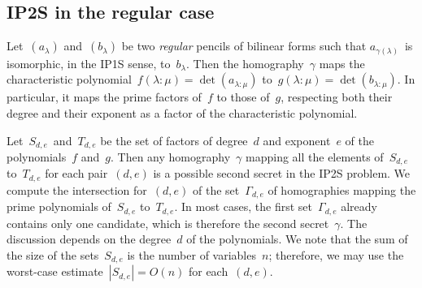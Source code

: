 \documentclass{article}%
\def\abs#1{\left|#1\right|}
\def\mat#1{\begin{pmatrix}#1\end{pmatrix}}
\def\smat{\def\arraystretch{.66}\mat}
\def\card#1{\abs{#1}}
\DeclareMathOperator\GL{GL}
\begin{document}
% 
% 


\subsection{IP2S in the regular case}

Let~$(a_{λ})$ and~$(b_{λ})$ be two \emph{regular} pencils of bilinear
forms such that $a_{γ(λ)}$~is isomorphic, in the IP1S sense, to~$b_{λ}$.
Then the homography~$γ$ maps the characteristic polynomial~$f(λ:μ)
= \det (a_{λ:μ})$ to~$g(λ:μ) = \det (b_{λ:μ})$. In particular, it maps the
prime factors of~$f$ to those of~$g$, respecting both their degree and
their exponent as a factor of the characteristic polynomial.

Let~$S_{d,e}$~and~$T_{d,e}$ be the set of factors of degree~$d$ and
exponent~$e$ of the polynomials~$f$ and~$g$. Then any homography~$γ$
mapping all the elements of~$S_{d,e}$ to~$T_{d,e}$ for each pair~$(d,e)$
is a possible second secret in the IP2S problem. We compute the
intersection for~$(d,e)$ of the set~$Γ_{d,e}$ of homographies mapping the
prime polynomials of~$S_{d,e}$ to~$T_{d,e}$. In most cases, the first
set~$Γ_{d,e}$ already contains only one candidate, which is therefore the
second secret~$γ$. The discussion depends on the degree~$d$ of the
polynomials. We note that the sum of the size of the sets~$S_{d,e}$ is
the number of variables~$n$; therefore, we may use the worst-case
estimate~$\card{S_{d,e}} = O(n)$ for each~$(d,e)$.
\end{document}
